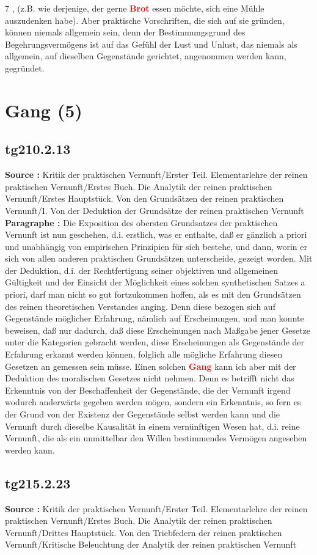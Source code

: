 \documentclass[a4paper,12pt,twoside]{book}
\newcommand{\match}[1]{\textcolor{red}{\textbf{#1}}}
\newcommand{\unnumberedsection}[1]{
	\section*{#1}
	\addcontentsline{toc}{section}{#1}
	\markright{#1}
}
\begin{document}
	
	7
	, (z.B. wie derjenige, der gerne \match{Brot} essen möchte, sich eine Mühle auszudenken habe). Aber praktische Vorschriften, die sich auf sie gründen, können niemals allgemein sein, denn der Bestimmungsgrund des Begehrungsvermögens ist auf das Gefühl der Lust und Unlust, das niemals als allgemein, auf dieselben Gegenstände gerichtet, angenommen werden kann, gegründet. 
	
	\unnumberedsection{Gang (5)} 
	\subsection*{tg210.2.13} 
	\textbf{Source : }Kritik der praktischen Vernunft/Erster Teil. Elementarlehre der reinen praktischen Vernunft/Erstes Buch. Die Analytik der reinen praktischen Vernunft/Erstes Hauptstück. Von den Grundsätzen der reinen praktischen Vernunft/I. Von der Deduktion der Grundsätze der reinen praktischen Vernunft\\  
	
	\textbf{Paragraphe : }Die Exposition des obersten Grundsatzes der praktischen Vernunft ist nun geschehen, d.i. erstlich, was er enthalte, daß er gänzlich a priori und unabhängig von empirischen Prinzipien für sich bestehe, und dann, worin er sich von allen anderen praktischen Grundsätzen unterscheide, gezeigt worden. Mit der Deduktion, d.i. der Rechtfertigung seiner objektiven und allgemeinen Gültigkeit und der Einsicht der Möglichkeit eines solchen synthetischen Satzes a priori, darf man nicht so gut fortzukommen hoffen, als es mit den Grundsätzen des reinen theoretischen Verstandes anging. Denn diese bezogen sich auf Gegenstände möglicher Erfahrung, nämlich auf Erscheinungen, und man konnte beweisen, daß nur dadurch, daß diese Erscheinungen nach Maßgabe jener Gesetze unter die Kategorien gebracht werden, diese Erscheinungen als Gegenstände der Erfahrung erkannt werden können, folglich alle mögliche Erfahrung diesen Gesetzen an gemessen sein müsse. Einen solchen  \match{Gang} kann ich aber mit der Deduktion des moralischen Gesetzes nicht nehmen. Denn es betrifft nicht das Erkenntnis von der Beschaffenheit der Gegenstände, die der Vernunft irgend wodurch anderwärts gegeben werden mögen, sondern ein Erkenntnis, so fern es der Grund von der Existenz der Gegenstände selbst werden kann und die Vernunft durch dieselbe Kausalität in einem vernünftigen Wesen hat, d.i. reine Vernunft, die als ein unmittelbar den Willen bestimmendes Vermögen angesehen werden kann. 
	
	\subsection*{tg215.2.23} 
	\textbf{Source : }Kritik der praktischen Vernunft/Erster Teil. Elementarlehre der reinen praktischen Vernunft/Erstes Buch. Die Analytik der reinen praktischen Vernunft/Drittes Hauptstück. Von den Triebfedern der reinen praktischen Vernunft/Kritische Beleuchtung der Analytik der reinen praktischen Vernunft\\  
	
\end{document}
